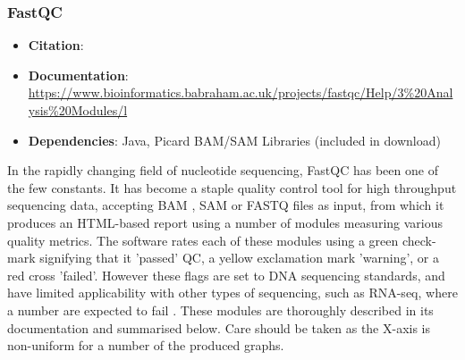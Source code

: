 \subsubsection{FastQC}
\begin{itemize}\itemsep-0.5em
\item[] \textbf{Citation}: 				\cite{andrews2010fastqc}
\item[] \textbf{Documentation}: 	\url{https://www.bioinformatics.babraham.ac.uk/projects/fastqc/Help/3\%20Analysis\%20Modules/l}
\item[] \textbf{Dependencies}: Java, Picard BAM/SAM Libraries (included in download)
\end{itemize}
In the rapidly changing field of nucleotide sequencing, FastQC has been one of the few constants. It has become a staple quality control tool for high throughput sequencing data, accepting BAM \citep{BAM}, SAM \citep{li2009sequence} or FASTQ files as input, from which it produces an HTML-based report using a number of modules measuring various quality metrics. The software rates each of these modules using a green check-mark signifying that it 'passed' QC, a yellow exclamation mark 'warning', or a red cross 'failed'. However these flags are set to DNA sequencing standards, and have limited applicability with other types of sequencing, such as RNA-seq, where a number are expected to fail \citep{fastqctutorial2021}. These modules are thoroughly described in its documentation and summarised below. Care should be taken as the X-axis is non-uniform for a number of the produced graphs.

